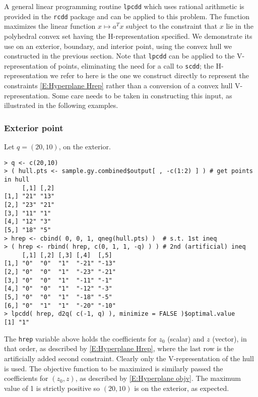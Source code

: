 A general linear programming routine \texttt{lpcdd} which uses 
rational arithmetic is provided in the \texttt{rcdd} package and can be applied  
to this problem.  The function maximizes the linear function $x \mapsto a^T x$ 
subject to the constraint that $x$ lie in the polyhedral convex set having 
the H-representation specified.  
We demonstrate its use on an exterior, boundary, and interior
point, using the convex hull we constructed in the previous section.  Note that \texttt{lpcdd} can be applied to the V-representation of points, eliminating
the need for a call to \texttt{scdd}; the H-representation we refer to here is the one we
construct directly to represent the constraints \eqref{E:Hyperplane Hrep}
rather than a conversion of a convex hull V-representation.  Some care needs to
be taken in constructing this input, as illustrated in the following examples.
{\singlespace
\subsubsection{Exterior point}
Let $q = (20,10)$, on the exterior.
\begin{verbatim}
> q <- c(20,10) 
> ( hull.pts <- sample.gy.combined$output[ , -c(1:2) ] ) # get points in hull
     [,1] [,2]
[1,] "21" "13"
[2,] "23" "21"
[3,] "11" "1" 
[4,] "12" "3" 
[5,] "18" "5" 
> hrep <- cbind( 0, 0, 1, qneg(hull.pts) )	# s.t. 1st ineq
> ( hrep <- rbind( hrep, c(0, 1, 1, -q) ) )	# 2nd (artificial) ineq
     [,1] [,2] [,3] [,4]  [,5] 
[1,] "0"  "0"  "1"  "-21" "-13"
[2,] "0"  "0"  "1"  "-23" "-21"
[3,] "0"  "0"  "1"  "-11" "-1" 
[4,] "0"  "0"  "1"  "-12" "-3" 
[5,] "0"  "0"  "1"  "-18" "-5" 
[6,] "0"  "1"  "1"  "-20" "-10"
> lpcdd( hrep, d2q( c(-1, q) ), minimize = FALSE )$optimal.value
[1] "1"
\end{verbatim}
}
The \texttt{hrep} variable above holds the coefficients for $z_0$ (scalar) and $z$ (vector), 
in that order, as described by \eqref{E:Hyperplane Hrep}, where the last row 
is the artificially added second constraint.  Clearly only the V-representation of the
 hull is used.
The objective function to be maximized is similarly passed the coefficients for $(z_0, z)$,
as described by \eqref{E:Hyperplane objv}.
The maximum value of 1 is strictly positive so $(20,10)$ is on the exterior, as expected.
